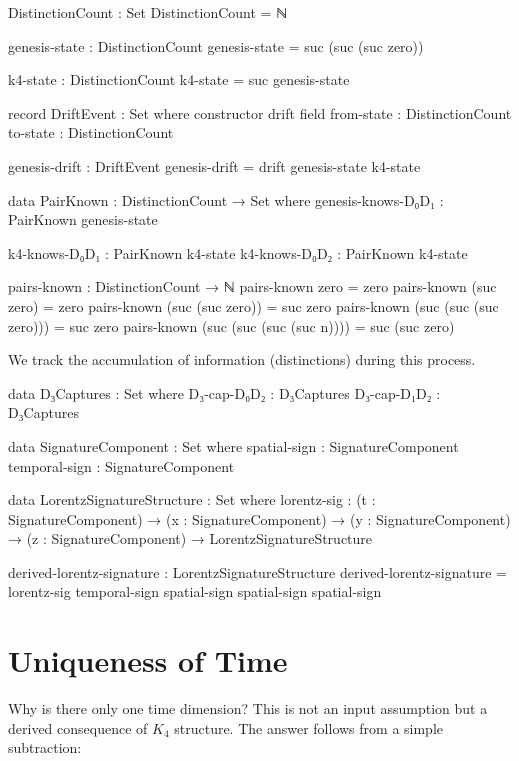 \documentclass[11pt,a4paper]{book}
\begin{document}
\begin{code}
DistinctionCount : Set
DistinctionCount = ℕ

genesis-state : DistinctionCount
genesis-state = suc (suc (suc zero))

k4-state : DistinctionCount
k4-state = suc genesis-state

record DriftEvent : Set where
  constructor drift
  field
    from-state : DistinctionCount
    to-state   : DistinctionCount

genesis-drift : DriftEvent
genesis-drift = drift genesis-state k4-state

data PairKnown : DistinctionCount → Set where
  genesis-knows-D₀D₁ : PairKnown genesis-state
  
  k4-knows-D₀D₁ : PairKnown k4-state
  k4-knows-D₀D₂ : PairKnown k4-state

pairs-known : DistinctionCount → ℕ
pairs-known zero = zero
pairs-known (suc zero) = zero
pairs-known (suc (suc zero)) = suc zero
pairs-known (suc (suc (suc zero))) = suc zero
pairs-known (suc (suc (suc (suc n)))) = suc (suc zero)
\end{code}

We track the accumulation of information (distinctions) during this process.

\begin{code}
data D₃Captures : Set where
  D₃-cap-D₀D₂ : D₃Captures
  D₃-cap-D₁D₂ : D₃Captures

data SignatureComponent : Set where
  spatial-sign  : SignatureComponent
  temporal-sign : SignatureComponent

data LorentzSignatureStructure : Set where
  lorentz-sig : (t : SignatureComponent) → 
                (x : SignatureComponent) → 
                (y : SignatureComponent) → 
                (z : SignatureComponent) → 
                LorentzSignatureStructure

derived-lorentz-signature : LorentzSignatureStructure
derived-lorentz-signature = lorentz-sig temporal-sign spatial-sign spatial-sign spatial-sign
\end{code}

\section{Uniqueness of Time}

Why is there only one time dimension? This is not an input assumption but a derived consequence 
of $K_4$ structure. The answer follows from a simple subtraction:
\end{document}
